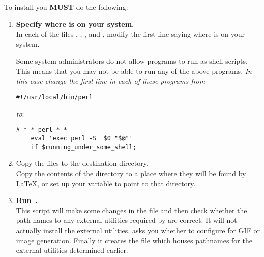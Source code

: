\begin{changebar}
To install \latextohtml{} you \textbf{MUST} do the following:
%
\begin{enumerate}
\item
\textbf{Specify where \Perl{} is on your system}. \\
In each of the files , , ,
 and ,
modify the first line saying where \Perl{} is on your system.


\noindent
Some system administrators do not allow \Perl{} programs to run as shell scripts.
This means that you may not be able to run any of the above programs.
\emph{In this case change the first line in each of these programs from }
\html{\smallskip}
\begin{small}
\verb|#!/usr/local/bin/perl |
\end{small}
\html{\smallskip}\emph{to}:
\begin{small}
\begin{verbatim}
# *-*-perl-*-*
    eval 'exec perl -S  $0 "$@"'
    if $running_under_some_shell;
\end{verbatim}
\end{small}

%
%
\item
Copy the files to the destination directory.\\
Copy the contents of the  directory to a place where they
will be found by \LaTeX, or set up your  variable to point
to that directory.

%
%
\item
\textbf{Run \,.} \\
This \Perl{} script will make some changes in the  file
and then check whether the path-names to any external utilities
required by  are correct.
It will not actually install the external utilities.
 asks you whether to configure for GIF or
 image generation.
Finally it creates the file  which houses pathnames for the
external utilities determined earlier.


\end{enumerate}
\end{changebar}
